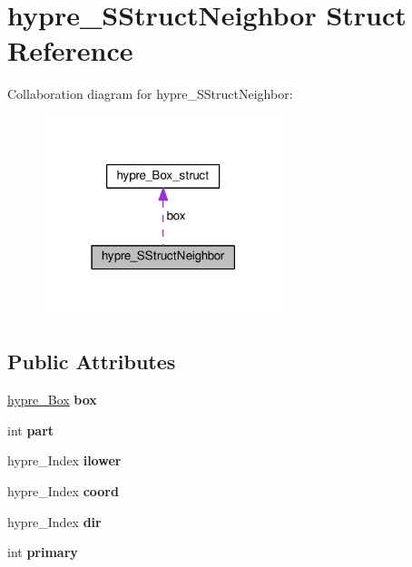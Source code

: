 \hypertarget{structhypre__SStructNeighbor}{}\section{hypre\+\_\+\+S\+Struct\+Neighbor Struct Reference}
\label{structhypre__SStructNeighbor}


Collaboration diagram for hypre\+\_\+\+S\+Struct\+Neighbor\+:
\nopagebreak
\begin{figure}[H]
\begin{center}
\leavevmode
\includegraphics[width=198pt]{structhypre__SStructNeighbor__coll__graph}
\end{center}
\end{figure}
\subsection*{Public Attributes}
\begin{DoxyCompactItemize}
\item 
\hypertarget{structhypre__SStructNeighbor_a02359bcbcabb45c28b1cec5f90c6bc56}{}\hyperlink{structhypre__Box__struct}{hypre\+\_\+\+Box} {\bfseries box}\label{structhypre__SStructNeighbor_a02359bcbcabb45c28b1cec5f90c6bc56}

\item 
\hypertarget{structhypre__SStructNeighbor_ace1bb7a43a3875ca5dd8dd085b6311e7}{}int {\bfseries part}\label{structhypre__SStructNeighbor_ace1bb7a43a3875ca5dd8dd085b6311e7}

\item 
\hypertarget{structhypre__SStructNeighbor_a4446e57096f33b5acb12ceed08630eca}{}hypre\+\_\+\+Index {\bfseries ilower}\label{structhypre__SStructNeighbor_a4446e57096f33b5acb12ceed08630eca}

\item 
\hypertarget{structhypre__SStructNeighbor_aed685d94e7c1459539b145ee428b539d}{}hypre\+\_\+\+Index {\bfseries coord}\label{structhypre__SStructNeighbor_aed685d94e7c1459539b145ee428b539d}

\item 
\hypertarget{structhypre__SStructNeighbor_ae0b5838c8ff8c69bcf1bdfc435b3fb2a}{}hypre\+\_\+\+Index {\bfseries dir}\label{structhypre__SStructNeighbor_ae0b5838c8ff8c69bcf1bdfc435b3fb2a}

\item 
\hypertarget{structhypre__SStructNeighbor_ac67310d7bfa6ad0c29453368d3f7c434}{}int {\bfseries primary}\label{structhypre__SStructNeighbor_ac67310d7bfa6ad0c29453368d3f7c434}

\end{DoxyCompactItemize}


